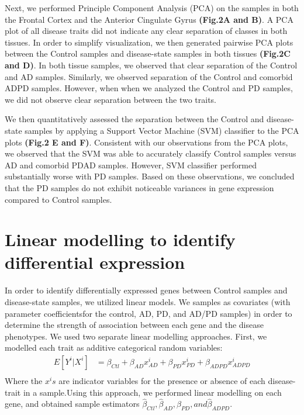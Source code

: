 Next, we performed Principle Component Analysis (PCA) on the samples in both the Frontal Cortex and the Anterior Cingulate Gyrus \textbf{(Fig.2A and B)}. A PCA plot of all disease traits did not indicate any clear separation of classes in both tissues. In order to simplify visualization, we then generated pairwise PCA plots between the Control samples and disease-state samples in both tissues \textbf{ (Fig.2C and D)}. In both tissue samples, we observed that clear separation of the Control and AD samples. Similarly, we observed separation of the Control and comorbid ADPD samples. However, when when we analyzed the Control and PD samples, we did not observe clear separation between the two traits.

We then quantitatively assessed the separation between the Control and disease-state samples by applying a Support Vector Machine (SVM) classifier to the PCA plots \textbf{(Fig.2 E and F)}. Consistent with our observations from the PCA plots, we observed that the SVM was able to accurately classify Control samples versus AD and comorbid PDAD samples. However, SVM classifier performed substantially worse with PD samples. Based on these observations, we concluded that the PD samples do not exhibit noticeable variances in gene expression compared to Control samples.

\section{Linear modelling to identify differential expression}
\label{sec:line-modell-ident}

In order to identify differentially expressed genes between Control samples and disease-state samples, we utilized linear models. We  samples as covariates (with parameter coefficientsfor the control, AD, PD, and AD/PD samples) in order to determine the strength of association between each gene and the disease phenotypes. We used two separate linear modelling approaches. First, we modelled each trait as additive categorical random variables: 
\begin{align*}
E[Y^{i}|X^{i}] &= \beta_{Ctl} + \beta_{AD}x_{AD}^{i} + \beta_{PD}x_{PD}^{i} + \beta_{ADPD}x_{ADPD}^{i} \\  
\end{align*}
Where the $x^{i}s$ are indicator variables for the presence or absence of each disease-trait in a sample.Using this approach, we performed linear modelling on each gene, and obtained sample estimators $\hat{\beta}_{Ctl}, \hat{\beta}_{AD}, \hat{\beta}_{PD}, and \hat{\beta}_{ADPD}$. 

